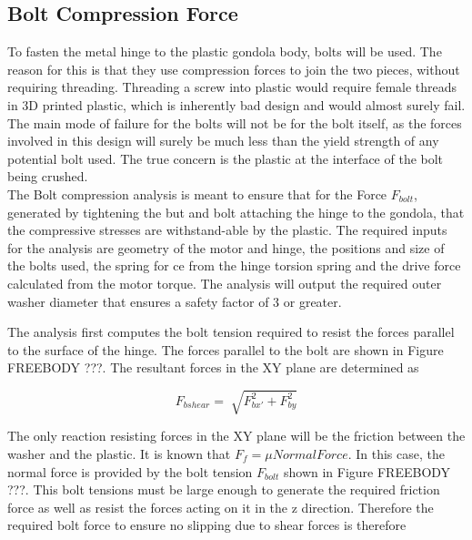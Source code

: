 \documentclass[../main.tex]{subfiles}
\begin{document}
\subsection{Bolt Compression Force} \label{compressive}

To fasten the metal hinge to the plastic gondola body, bolts will be used. The reason for this is that they use compression forces to join the two pieces, without requiring threading. Threading a screw into plastic would require female threads in 3D printed plastic, which is inherently bad design and would almost surely fail. \\

The main mode of failure for the bolts will not be for the bolt itself, as the forces involved in this design will surely be much less than the yield strength of any potential bolt used. The true concern is the plastic at the interface of the bolt being crushed. \\

The Bolt compression analysis is meant to ensure that for the Force $F_{bolt}$, generated by tightening the but and bolt attaching the hinge to the gondola, that the compressive stresses are withstand-able by the plastic. The required inputs for the analysis are geometry of the motor and hinge, the positions and size of the bolts used, the spring for ce from the hinge torsion spring and the drive force calculated from the motor torque. The analysis will output the required outer washer diameter that ensures a safety factor of 3 or greater. 
  
The analysis first computes the bolt tension required to resist the forces parallel to the surface of the hinge. The forces parallel to the bolt are shown in Figure FREEBODY ???. The resultant forces in the XY plane are determined as 

\begin{displaymath}
F_{bshear} = \sqrt[]{F_{bx'}^2 + F_{by}^2}
\end{displaymath}

The only reaction resisting forces in the XY plane will be the friction between the washer and the plastic. It is known that $F_f = \mu Normal Force$. In this case, the normal force is provided by the bolt tension $F_{bolt}$ shown in Figure FREEBODY ???. This bolt tensions must be large enough to generate the required friction force as well as resist the forces acting on it in the z direction. Therefore the required bolt force to ensure no slipping due to shear forces is therefore
\end{document}
